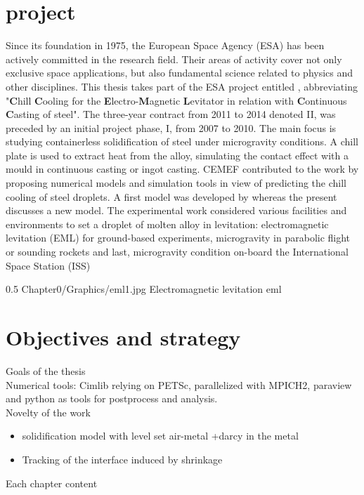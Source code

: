 \section{\ccemlcc project}
Since its foundation in 1975, the European Space Agency (ESA) has been actively committed in the research field.
Their areas of activity cover not only exclusive space applications, but also fundamental science related to 
physics and other disciplines. This thesis takes part of the ESA project entitled \ccemlcc, abbreviating
"\textbf{C}hill \textbf{C}ooling for the \textbf{E}lectro-\textbf{M}agnetic \textbf{L}evitator in relation with 
\textbf{C}ontinuous \textbf{C}asting of steel".
The three-year contract from 2011 to 2014 denoted \ccemlcc II, was preceded by an initial project phase, \ccemlcc I,
from 2007 to 2010. The main focus is studying containerless solidification of steel under microgravity conditions. 
A chill plate is used to extract heat from the alloy, simulating the contact effect with a mould in continuous casting
or ingot casting.
CEMEF contributed to the work by proposing numerical models and simulation tools in view of predicting the chill cooling of steel droplets. 
A first model was developed by \citet{rivaux_simulation_2011} whereas the present discusses a new model. 
The experimental work considered various facilities and environments to set a droplet of molten alloy in levitation: electromagnetic levitation (EML) 
for ground-based experiments, microgravity in parabolic flight or sounding rockets and last, microgravity condition on-board the International Space Station (ISS)

\begin{figureth}
{0.5}
{Chapter0/Graphics/eml1.jpg}
{Electromagnetic levitation}
{eml}
\end{figureth}



\section{Objectives and strategy}
Goals of the thesis \\ 
Numerical tools: Cimlib relying on PETSc, parallelized with MPICH2, paraview and python as tools for postprocess and analysis. \\
Novelty of the work
\begin{itemize}
\item solidification model with level set air-metal +darcy in the metal
\item Tracking of the interface induced by shrinkage
\end{itemize}
Each chapter content

